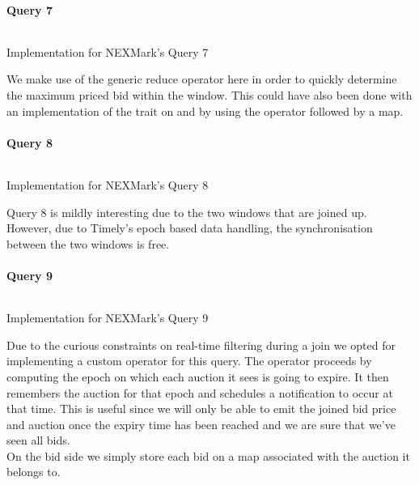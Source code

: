\paragraph{Query 7}
\begin{listing}[H]
  \inputminted[firstline=631,lastline=637]{rust}{benchmarks/src/nexmark.rs}
  \caption{Implementation for NEXMark's Query 7}
  \label{lst:nexmark-query7}
\end{listing}

We make use of the generic reduce operator here in order to quickly determine the maximum priced bid within the window. This could have also been done with an implementation of the  trait on  and by using the  operator followed by a map.

\paragraph{Query 8}
\begin{listing}[H]
  \inputminted[firstline=670,lastline=679]{rust}{benchmarks/src/nexmark.rs}
  \caption{Implementation for NEXMark's Query 8}
  \label{lst:nexmark-query8}
\end{listing}

Query 8 is mildly interesting due to the two windows that are joined up. However, due to Timely's epoch based data handling, the synchronisation between the two windows is free.

\paragraph{Query 9}\label{sec:query9}
\begin{listing}[H]
  \inputminted[firstline=702,lastline=739]{rust}{benchmarks/src/nexmark.rs}
  \caption{Implementation for NEXMark's Query 9}
  \label{lst:nexmark-query9}
\end{listing}

Due to the curious constraints on real-time filtering during a join we opted for implementing a custom operator for this query. The operator proceeds by computing the epoch on which each auction it sees is going to expire. It then remembers the auction for that epoch and schedules a notification to occur at that time. This is useful since we will only be able to emit the joined bid price and auction once the expiry time has been reached and we are sure that we've seen all bids. \\

On the bid side we simply store each bid on a map associated with the auction it belongs to. \\

